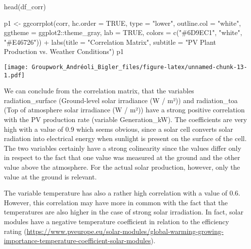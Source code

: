 \documentclass[
]{article}
\newenvironment{Shaded}{\begin{snugshade}}{\end{snugshade}}
\newcommand{\AttributeTok}[1]{\textcolor[rgb]{0.77,0.63,0.00}{#1}}
\newcommand{\ConstantTok}[1]{\textcolor[rgb]{0.00,0.00,0.00}{#1}}
\newcommand{\FunctionTok}[1]{\textcolor[rgb]{0.00,0.00,0.00}{#1}}
\newcommand{\NormalTok}[1]{#1}
\newcommand{\OtherTok}[1]{\textcolor[rgb]{0.56,0.35,0.01}{#1}}
\newcommand{\SpecialCharTok}[1]{\textcolor[rgb]{0.00,0.00,0.00}{#1}}
\newcommand{\StringTok}[1]{\textcolor[rgb]{0.31,0.60,0.02}{#1}}
\begin{document}
\begin{Shaded}
\begin{Highlighting}[]
\FunctionTok{head}\NormalTok{(df\_corr)}
\end{Highlighting}
\end{Shaded}

\begin{Shaded}
\begin{Highlighting}[]
\NormalTok{p1 }\OtherTok{\textless{}{-}} \FunctionTok{ggcorrplot}\NormalTok{(corr, }\AttributeTok{hc.order =} \ConstantTok{TRUE}\NormalTok{, }\AttributeTok{type =} \StringTok{"lower"}\NormalTok{,}
   \AttributeTok{outline.col =} \StringTok{"white"}\NormalTok{,}
   \AttributeTok{ggtheme =}\NormalTok{ ggplot2}\SpecialCharTok{::}\NormalTok{theme\_gray,}
   \AttributeTok{lab =} \ConstantTok{TRUE}\NormalTok{,}
   \AttributeTok{colors =} \FunctionTok{c}\NormalTok{(}\StringTok{"\#6D9EC1"}\NormalTok{, }\StringTok{"white"}\NormalTok{, }\StringTok{"\#E46726"}\NormalTok{)) }\SpecialCharTok{+} 
   \FunctionTok{labs}\NormalTok{(}\AttributeTok{title =} \StringTok{"Correlation Matrix"}\NormalTok{,}
       \AttributeTok{subtitle =} \StringTok{"PV Plant Production vs. Weather Conditions"}\NormalTok{)}
\NormalTok{p1}
\end{Highlighting}
\end{Shaded}

\texttt{[image: Groupwork\_Andréoli\_Bigler\_files/figure-latex/unnamed-chunk-13-1.pdf]}

We can conclude from the correlation matrix, that the variables
radiation\_surface (Ground-level solar irradiance (W / m²)) and
radiation\_toa (Top of atmosphere solar irradiance (W / m²)) have a
strong positive correlation with the PV production rate (variable
Generation\_kW). The coefficients are very high with a value of 0.9
which seems obvious, since a solar cell converts solar radiation into
electrical energy when sunlight is present on the surface of the cell.
The two variables certainly have a strong colinearity since the values
differ only in respect to the fact that one value was measured at the
ground and the other value above the atmosphere. For the actual solar
production, however, only the value at the ground is relevant.

The variable temperature has also a rather high correlation with a value
of 0.6. However, this correlation may have more in common with the fact
that the temperatures are also higher in the case of strong solar
irradiation. In fact, solar modules have a negative temperature
coefficient in relation to the efficiency rating
(\url{https://www.pveurope.eu/solar-modules/global-warming-growing-importance-temperature-coefficient-solar-modules}).
\end{document}

